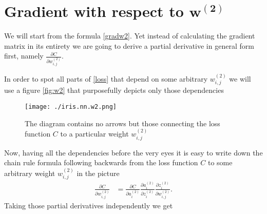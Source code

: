 \documentclass[a4paper,12pt,notitlepage]{article}
\begin{document}
\newpage
\section*{Gradient with respect to $\mathbf{w^{(2)}}$}
We will start from the formula \eqref{gradw2}. Yet instead of calculating the gradient matrix in its entirety we are going to derive a partial derivative in general form first, namely $\frac{\partial C}{\partial w_{i,j}^{(2)}}$.

In order to spot all parts of \eqref{loss} that depend on some arbitrary $w_{i,j}^{(2)}$ we will use a figure \eqref{fig:w2} that purposefully depicts only those dependencies
\begin{figure}[H]
    \centering
    \texttt{[image: ./iris.nn.w2.png]}\\
    \caption{The diagram contains no arrows but those connecting the loss function ${C}$ to a particular weight ${w_{i,j}^{(2)}}$}
    \label{fig:w2}
\end{figure}
Now, having all the dependencies before the very eyes it is easy to write down the chain rule formula following backwards from the loss function $C$ to some arbitrary weight $w_{i,j}^{(2)}$ in the picture
\begin{equation} \label{chain2}
\begin{split}
\frac{\partial C}{\partial w_{i,j}^{(2)}}&=\frac{\partial C}{\partial a_{i}^{(2)}}\frac{\partial a_{i}^{(2)}}{\partial z_{i}^{(2)}}\frac{\partial z_{i}^{(2)}}{\partial w_{i,j}^{(2)}}.
\end{split}
\end{equation}
Taking those partial derivatives independently we get
\end{document}
